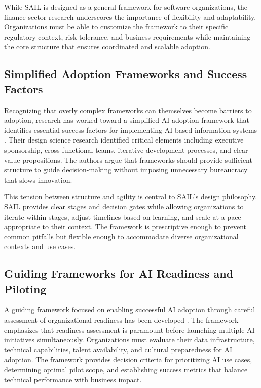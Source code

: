 \documentclass[]{imc-inf}
\begin{document}
While SAIL is designed as a general framework for software organizations, the finance sector research underscores the importance of flexibility and adaptability. Organizations must be able to customize the framework to their specific regulatory context, risk tolerance, and business requirements while maintaining the core structure that ensures coordinated and scalable adoption.

\subsection{Simplified Adoption Frameworks and Success Factors}

Recognizing that overly complex frameworks can themselves become barriers to adoption, research has worked toward a simplified AI adoption framework that identifies essential success factors for implementing AI-based information systems \citep{Kucevic2024}. Their design science research identified critical elements including executive sponsorship, cross-functional teams, iterative development processes, and clear value propositions. The authors argue that frameworks should provide sufficient structure to guide decision-making without imposing unnecessary bureaucracy that slows innovation.

This tension between structure and agility is central to SAIL's design philosophy. SAIL provides clear stages and decision gates while allowing organizations to iterate within stages, adjust timelines based on learning, and scale at a pace appropriate to their context. The framework is prescriptive enough to prevent common pitfalls but flexible enough to accommodate diverse organizational contexts and use cases.

\subsection{Guiding Frameworks for AI Readiness and Piloting}

A guiding framework focused on enabling successful AI adoption through careful assessment of organizational readiness has been developed \citep{Amling2024}. The framework emphasizes that readiness assessment is paramount before launching multiple AI initiatives simultaneously. Organizations must evaluate their data infrastructure, technical capabilities, talent availability, and cultural preparedness for AI adoption. The framework provides decision criteria for prioritizing AI use cases, determining optimal pilot scope, and establishing success metrics that balance technical performance with business impact.
\end{document}
